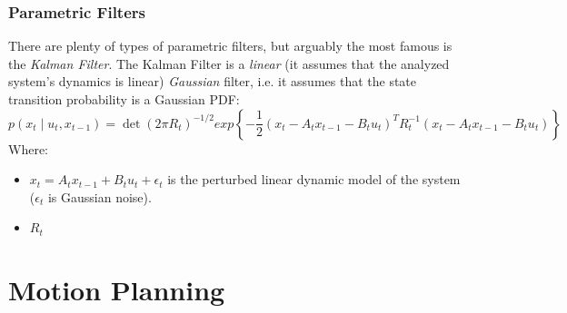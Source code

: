                        \subsubsection{Parametric Filters}
                            There are plenty of types of parametric filters, but arguably the most famous is the \textit{Kalman Filter}. The Kalman Filter is a \textit{linear} (it assumes that the analyzed system's dynamics is linear) \textit{Gaussian} filter, i.e. it assumes that the state transition probability is a Gaussian PDF:
                            \begin{equation}\label{Gaussian_PDF}
                                p(x_t\mid u_t,x_{t-1})=\det(2\pi R_t)^{-1/2}exp\left\{-\frac{1}{2}\left(x_t-A_tx_{t-1}-B_{t}u_{t}\right)^{T}R_t^{-1}\left(x_t-A_tx_{t-1}-B_{t}u_{t}\right)\right\}
                            \end{equation}
                            Where:
                            \begin{itemize}
                                \item $x_t=A_tx_{t-1}+B_tu_t+\epsilon_t$ is the perturbed linear dynamic model of the system ($\epsilon_t$ is Gaussian noise).
                                \item $R_t$
                            \end{itemize}


                            
                \section{Motion Planning}
